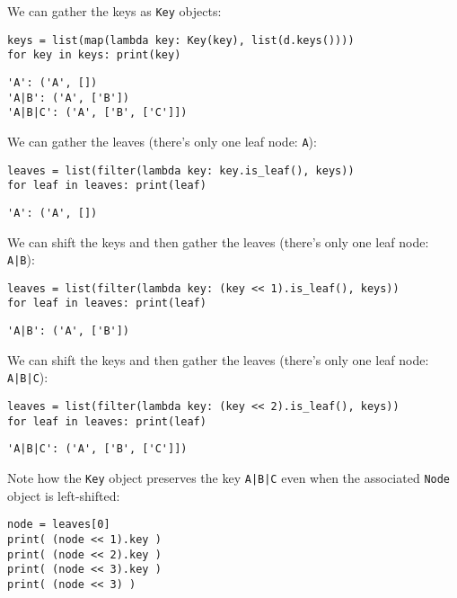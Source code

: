 \documentclass[10pt]{amsart}
\numberwithin{equation}{section}
\begin{document}
We can gather the keys as \texttt{Key} objects:
\begin{verbatim}
keys = list(map(lambda key: Key(key), list(d.keys())))
for key in keys: print(key)
\end{verbatim}

\begin{verbatim}
'A': ('A', [])
'A|B': ('A', ['B'])
'A|B|C': ('A', ['B', ['C']])
\end{verbatim}


We can gather the leaves (there's only one leaf node: \texttt{A}):
\begin{verbatim}
leaves = list(filter(lambda key: key.is_leaf(), keys))
for leaf in leaves: print(leaf)
\end{verbatim}

\begin{verbatim}
'A': ('A', [])
\end{verbatim}


We can shift the keys and then gather the leaves (there's only one leaf node: \texttt{A|B}):
\begin{verbatim}
leaves = list(filter(lambda key: (key << 1).is_leaf(), keys))
for leaf in leaves: print(leaf)
\end{verbatim}

\begin{verbatim}
'A|B': ('A', ['B'])
\end{verbatim}


We can shift the keys and then gather the leaves (there's only one leaf node: \texttt{A|B|C}):
\begin{verbatim}
leaves = list(filter(lambda key: (key << 2).is_leaf(), keys))
for leaf in leaves: print(leaf)
\end{verbatim}

\begin{verbatim}
'A|B|C': ('A', ['B', ['C']])
\end{verbatim}


Note how the \texttt{Key} object preserves the key \texttt{A|B|C} even when the associated \texttt{Node} object
is left-shifted:
\begin{verbatim}
node = leaves[0]
print( (node << 1).key )
print( (node << 2).key )
print( (node << 3).key )
print( (node << 3) )
\end{verbatim}
\end{document}
